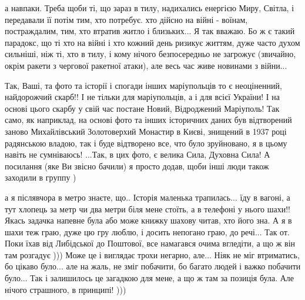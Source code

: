 а навпаки. Треба щоби ті, що зараз в тилу, надихались енергією Миру, Світла, і
передавали її потім тим, хто потребує. хто дійсно на війні - воїнам,
постраждалим, тим, хто втратив житло і близьких... Я так вважаю. Бо ж є такий
парадокс, що ті хто на війні і хто кожний день ризикує життям, дуже часто духом
сильніші, ніж ті, хто в тилу, і кому нічого безпосередньо не загрожує
(звичайно, окрім ракети з чергової ракетної атаки), але весь час живе новинами
з війни... 



Так, Ваші, та фото та історії і спогади інших маріупольців то є неоціненний,
найдорожчий скарб!! І не тільки для маріупольців, а і для всієї України! І на
основі цього скарбу у свій час постане Новий, Відроджений Маріуполь! Так само,
як наприклад, на основі фото та інших історичних даних був відтворений заново
Михайлівський Золотоверхий Монастир в Києві, знищений в 1937 році радянською
владою, так і буде відтворено все, что було зруйновано, я в цьому навіть не
сумніваюсь! ...Так, в цих фото, є велика Сила, Духовна Сила! А посилання (яке
Ви звісно бачили) я просто додав, щоби інші люди також заходили в группу )

а я післявчора в метро знаєте, що.. Історія маленька трапилась... їду в вагоні,
а тут хлопець за метр чи два метри біля мене стоїть, а в телефоні у нього
шахи!! Якась задачка напевне була або може книжку шахову читав, хто його зна. А
я в шахи теж граю, дуже цю гру люблю, і досить непогано граю, до речі... Так
от. Поки їхав від Либідської до Поштової, все намагався очима вгледіти, а що ж
він там розгадує ))) Може це і виглядає трохи негарно, але... Ніяк не міг
втриматись, бо цікаво було... але на жаль, не зміг побачити, бо багато людей і
важко побачити було... Так і залишилось це загадкою для мене, а що ж там за
позиція була. Але нічого страшного, в принципі! )))
